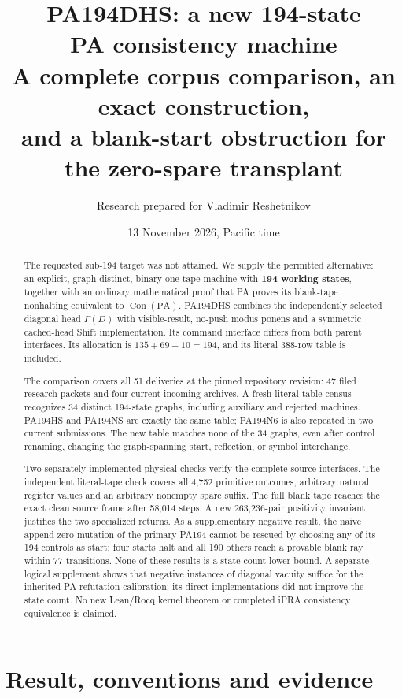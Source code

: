 \documentclass[11pt,letterpaper]{article}
\title{PA194DHS: a new 194-state\\PA consistency machine\\[3pt]\large A complete corpus comparison, an exact construction,\\and a blank-start obstruction for the zero-spare transplant}
\author{Research prepared for Vladimir Reshetnikov}
\date{13 November 2026, Pacific time}
\newcommand{\PA}{\mathrm{PA}}
\newcommand{\Con}{\operatorname{Con}}
\begin{document}
\maketitle
\begin{abstract}
The requested sub-194 target was not attained. We supply the permitted
alternative: an explicit, graph-distinct, binary one-tape machine with
\textbf{194 working states}, together with an ordinary mathematical proof that
PA proves its blank-tape nonhalting equivalent to $\Con(\PA)$.
PA194DHS combines the independently selected diagonal head $\Gamma(D)$
with visible-result, no-push modus ponens and a symmetric cached-head
Shift implementation. Its command interface differs from both parent
interfaces. Its allocation is $135+69-10=194$, and its literal 388-row table
is included.

The comparison covers all 51 deliveries at the pinned repository revision:
47 filed research packets and four current incoming archives. A fresh
literal-table census recognizes 34 distinct 194-state graphs, including
auxiliary and rejected machines. PA194HS and PA194NS are exactly the same
table; PA194N6 is also repeated in two current submissions. The new table
matches none of the 34 graphs, even after control renaming, changing the
graph-spanning start, reflection, or symbol interchange.

Two separately implemented physical checks verify the complete source
interfaces. The independent literal-tape check covers all 4,752 primitive
outcomes, arbitrary natural register values and an arbitrary nonempty
spare suffix. The full blank tape reaches the exact clean source frame
after 58,014 steps. A new 263,236-pair positivity invariant justifies the
two specialized returns. As a supplementary negative result, the naive
append-zero mutation of the primary PA194 cannot be rescued by choosing
any of its 194 controls as start: four starts halt and all 190 others
reach a provable blank ray within 77 transitions. None of these results
is a state-count lower bound. A separate logical supplement shows that
negative instances of diagonal vacuity suffice for the inherited PA
refutation calibration; its direct implementations did not improve the
state count. No new Lean/Rocq kernel theorem or completed
iPRA consistency equivalence is claimed.
\end{abstract}
\clearpage
{\small\setlength{\parskip}{0pt}\tableofcontents}
\clearpage

\section{Result, conventions and evidence}
\label{sec:result}
\end{document}
